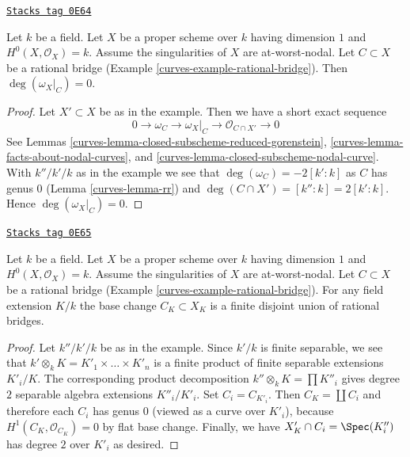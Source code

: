 \begin{lemma}
\label{curves-lemma-rational-bridge-zero}
\href{https://stacks.math.columbia.edu/tag/0E64}{\texttt{Stacks tag 0E64}}

Let $k$ be a field. Let $X$ be a proper scheme over $k$ having dimension $1$
and $H^0(X, \mathcal{O}_X) = k$. Assume the singularities of $X$ are
at-worst-nodal. Let $C \subset X$ be a rational bridge
(Example \ref{curves-example-rational-bridge}). Then $\deg(\omega_X|_C) = 0$.
\end{lemma}

\begin{proof}

Let $X' \subset X$ be as in the example. Then we have a short exact
sequence
$$
0 \to \omega_C \to \omega_X|_C \to \mathcal{O}_{C \cap X'} \to 0
$$
See Lemmas \ref{curves-lemma-closed-subscheme-reduced-gorenstein},
\ref{curves-lemma-facts-about-nodal-curves}, and
\ref{curves-lemma-closed-subscheme-nodal-curve}.
With $k''/k'/k$ as in the example we see that
$\deg(\omega_C) = -2[k' : k]$ as $C$ has genus $0$
(Lemma \ref{curves-lemma-rr})
and $\deg(C \cap X') = [k'' : k] = 2[k' : k]$.
Hence $\deg(\omega_X|_C) = 0$.
\end{proof}

\begin{lemma}
\label{curves-lemma-rational-bridge-field-extension}
\href{https://stacks.math.columbia.edu/tag/0E65}{\texttt{Stacks tag 0E65}}

Let $k$ be a field. Let $X$ be a proper scheme over $k$ having dimension $1$
and $H^0(X, \mathcal{O}_X) = k$. Assume the singularities of $X$ are
at-worst-nodal. Let $C \subset X$ be a rational bridge
(Example \ref{curves-example-rational-bridge}).
For any field extension $K/k$ the base change $C_K \subset X_K$
is a finite disjoint union of rational bridges.
\end{lemma}

\begin{proof}
Let $k''/k'/k$ be as in the example.
Since $k'/k$ is finite separable, we see that
$k' \otimes_k K = K'_1 \times \ldots \times K'_n$
is a finite product of finite separable extensions $K'_i/K$.
The corresponding product decomposition
$k'' \otimes_k K = \prod K''_i$ gives degree $2$
separable algebra extensions $K''_i/K'_i$.
Set $C_i = C_{K'_i}$. Then $C_K = \coprod C_i$
and therefore each $C_i$ has genus $0$ (viewed as a curve
over $K'_i$), because $H^1(C_K, \mathcal{O}_{C_K}) = 0$
by flat base change.
Finally, we have $X'_K \cap C_i = \Spec(K''_i)$ has degree $2$
over $K'_i$ as desired.
\end{proof}

